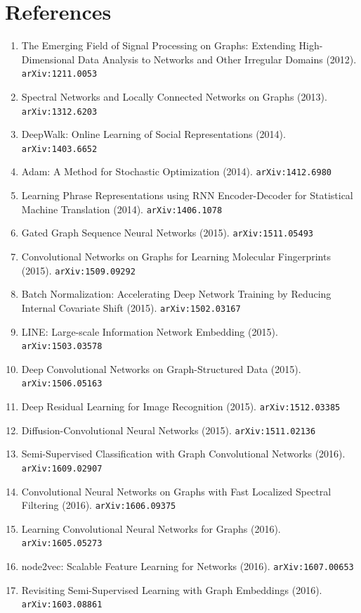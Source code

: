 \documentclass[11pt]{article}
\begin{document}
\section*{References}
\begin{enumerate}\small
  \item The Emerging Field of Signal Processing on Graphs: Extending
  High-Dimensional Data Analysis to Networks and Other Irregular Domains (2012). \texttt{arXiv:1211.0053}
  \item Spectral Networks and Locally Connected Networks on Graphs (2013). \texttt{arXiv:1312.6203}
  \item DeepWalk: Online Learning of Social Representations (2014). \texttt{arXiv:1403.6652}
  \item Adam: A Method for Stochastic Optimization (2014). \texttt{arXiv:1412.6980}
  \item Learning Phrase Representations using RNN Encoder-Decoder for
  Statistical Machine Translation (2014). \texttt{arXiv:1406.1078}
  \item Gated Graph Sequence Neural Networks (2015). \texttt{arXiv:1511.05493}
  \item Convolutional Networks on Graphs for Learning Molecular Fingerprints (2015). \texttt{arXiv:1509.09292}
  \item Batch Normalization: Accelerating Deep Network Training by Reducing
  Internal Covariate Shift (2015). \texttt{arXiv:1502.03167}
  \item LINE: Large-scale Information Network Embedding (2015). \texttt{arXiv:1503.03578}
  \item Deep Convolutional Networks on Graph-Structured Data (2015). \texttt{arXiv:1506.05163}
  \item Deep Residual Learning for Image Recognition (2015). \texttt{arXiv:1512.03385}
  \item Diffusion-Convolutional Neural Networks (2015). \texttt{arXiv:1511.02136}
  \item Semi-Supervised Classification with Graph Convolutional Networks (2016). \texttt{arXiv:1609.02907}
  \item Convolutional Neural Networks on Graphs with Fast Localized Spectral
  Filtering (2016). \texttt{arXiv:1606.09375}
  \item Learning Convolutional Neural Networks for Graphs (2016). \texttt{arXiv:1605.05273}
  \item node2vec: Scalable Feature Learning for Networks (2016). \texttt{arXiv:1607.00653}
  \item Revisiting Semi-Supervised Learning with Graph Embeddings (2016). \texttt{arXiv:1603.08861}

\end{enumerate}
\end{document}
